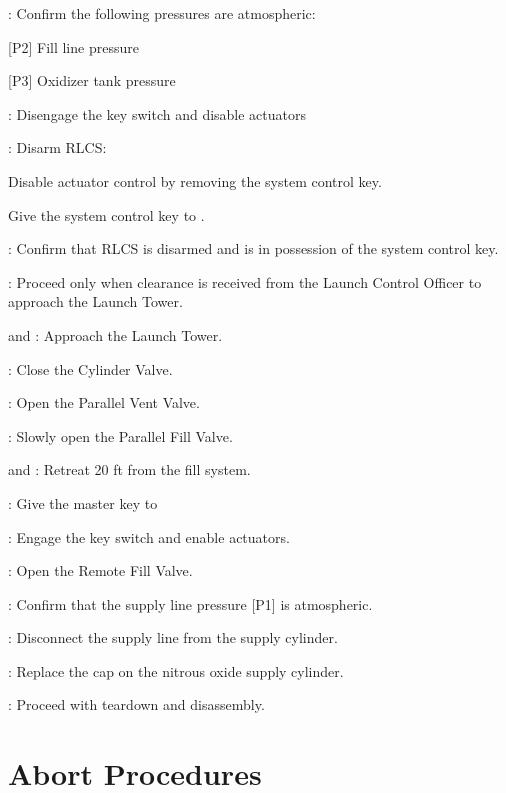 \begin{checklist}
    \item \control{}: Confirm the following pressures are atmospheric:
    \begin{checklist}
        \item {[P2]} Fill line pressure
        \item {[P3]} Oxidizer tank pressure
    \end{checklist}
    \item \control{}: Disengage the key switch and disable actuators
    \item \control{}: Disarm RLCS:
    \begin{checklist}
        \item Disable actuator control by removing the system control key.
        \item Give the system control key to \ops{}.
    \end{checklist}
    \item \ops: Confirm that RLCS is disarmed and \ops{} is in possession of the system control  key.
    \item \ops{}: Proceed only when clearance is received from the Launch Control Officer to approach the Launch Tower.
    \item \primary{} and \secondary: Approach the Launch Tower.
    \item \primary{}: Close the Cylinder Valve.
    \item \primary{}: Open the Parallel Vent Valve.
    \item \primary{}: Slowly open the Parallel Fill Valve.
    \item \primary{} and \secondary: Retreat 20 ft from the fill system.
    \item \ops: Give the master key to \control{}
    \item \control{}: Engage the key switch and enable actuators.
    \item \control{}: Open the Remote Fill Valve.
    \item \control{}: Confirm that the supply line pressure [P1] is atmospheric.
    \item \primary{}: Disconnect the supply line from the supply cylinder.
    \item \primary{}: Replace the cap on the nitrous oxide supply cylinder.
    \item \ops{}: Proceed with teardown and disassembly.
\setcounter{checklistnum}{0}
\newpage
    
\section{Abort Procedures} 

\end{checklist}

